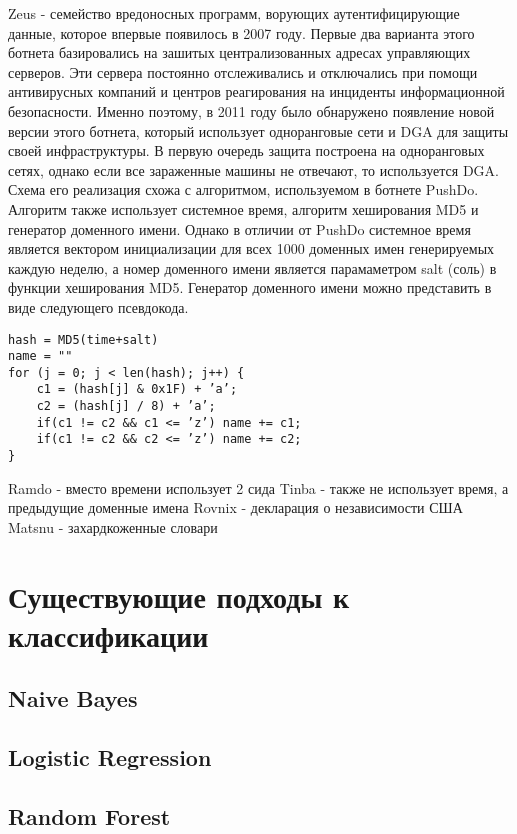 Zeus - семейство вредоносных программ, ворующих аутентифицирующие данные, которое впервые появилось в 2007 году. Первые два варианта этого ботнета базировались на зашитых централизованных адресах управляющих серверов. Эти сервера постоянно отслеживались и отключались при помощи антивирусных компаний и центров реагирования на инциденты информационной безопасности. Именно поэтому, в 2011 году было обнаружено появление новой версии этого ботнета, который использует одноранговые сети и DGA для защиты своей инфраструктуры. В первую очередь защита построена на одноранговых сетях, однако если все зараженные машины не отвечают, то используется DGA. Схема его реализация схожа с алгоритмом, используемом в ботнете PushDo. Алгоритм также использует системное время, алгоритм хеширования MD5 и генератор доменного имени. Однако в отличии от PushDo системное время является вектором инициализации для всех 1000 доменных имен генерируемых каждую неделю, а номер доменного имени является парамаметром salt (соль) в функции хеширования MD5. Генератор доменного имени можно представить в виде следующего псевдокода.
\begin{lstlisting}
hash = MD5(time+salt)
name = ""
for (j = 0; j < len(hash); j++) {
    c1 = (hash[j] & 0x1F) + ’a’;
    c2 = (hash[j] / 8) + ’a’;
    if(c1 != c2 && c1 <= ’z’) name += c1;
    if(c1 != c2 && c2 <= ’z’) name += c2;
}
\end{lstlisting}
Ramdo - вместо времени использует 2 сида
Tinba - также не использует время, а предыдущие доменные имена
Rovnix - декларация о независимости США
Matsnu - захардкоженные словари

\section{Существующие подходы к классификации}
    \subsection{Naive Bayes}
    \subsection{Logistic Regression}
    \subsection{Random Forest}
